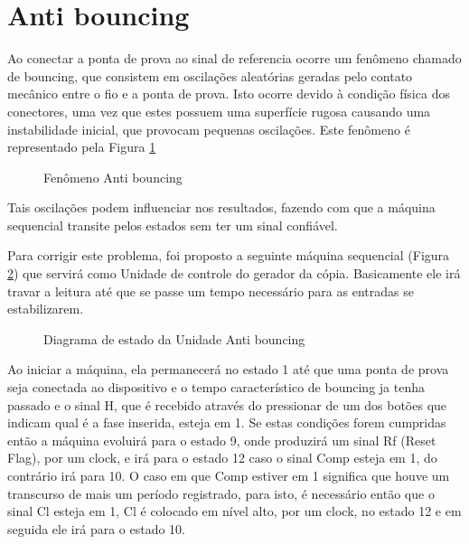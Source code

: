 \documentclass[12pt,a4paper,openany]{abntex2}
\begin{document}
\section{Anti bouncing}

Ao conectar a ponta de prova ao sinal de referencia ocorre um fenômeno chamado de bouncing, que consistem em oscilações aleatórias geradas pelo contato mecânico entre o fio e a ponta de prova. Isto ocorre devido à condição física dos conectores, uma vez que estes possuem uma superfície rugosa causando uma instabilidade inicial, que provocam pequenas oscilações. Este fenômeno é representado pela Figura \ref{fig:bounceTimingDiagram}

\begin{figure}[!htp]
	\centering
	\caption{Fenômeno Anti bouncing}
	\label{fig:bounceTimingDiagram}
\end{figure}

Tais oscilações podem influenciar nos resultados, fazendo com que a máquina sequencial transite pelos estados sem ter um sinal confiável.

Para corrigir este problema, foi proposto a seguinte máquina sequencial (Figura \ref{fig:antibouncing-diagrama}) que servirá como Unidade de controle do gerador da cópia. Basicamente ele irá travar a leitura até que se passe um tempo necessário para as entradas se estabilizarem.

\begin{figure}[!htp]
	\centering
	\caption{Diagrama de estado da Unidade Anti bouncing}
	\label{fig:antibouncing-diagrama}
\end{figure}

Ao iniciar a máquina, ela permanecerá no estado 1 até que uma ponta de prova seja conectada ao dispositivo e o tempo característico de bouncing ja tenha passado e o sinal H, que é recebido através do pressionar de um dos botões que indicam qual é a fase inserida, esteja em 1. Se estas condições forem cumpridas então a máquina evoluirá para o estado 9, onde produzirá um sinal Rf (Reset Flag), por um clock, e irá para o estado 12 caso o sinal Comp esteja em 1, do contrário irá para 10. O caso em que Comp estiver em 1 significa que houve um transcurso de mais um período registrado, para isto, é necessário então que o sinal Cl esteja em 1, Cl é colocado em nível alto, por um clock, no estado 12 e em seguida ele irá para o estado 10.
\end{document}
